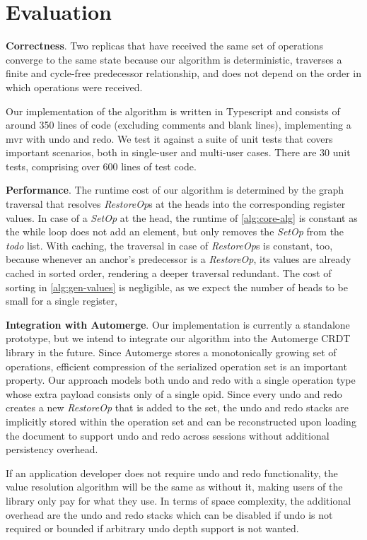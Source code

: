 \documentclass[sigplan]{acmart}
\newcommand{\setopkind}{\textit{SetOp}}
\newcommand{\restopkind}{\textit{RestoreOp}}
\begin{document}
\section{Evaluation}\label{sec:evaluation}

\textbf{Correctness}.
Two replicas that have received the same set of
operations converge to the same state because our algorithm is deterministic,
traverses a finite and cycle-free predecessor relationship,
and does not depend on the order in which operations were received.

Our implementation of the algorithm is written in Typescript and
consists of around 350 lines of code (excluding comments and blank lines),
implementing a \gls*{mvr} with undo and redo.
We test it against a suite of unit tests that covers important
scenarios, both in single-user and multi-user cases.
There are 30 unit tests, comprising over 600 lines of test code.

\textbf{Performance}.
The runtime cost of our algorithm is determined by the graph traversal that
resolves \restopkind{}s at the heads into the corresponding register values.
In case of a \setopkind{} at the head, the runtime of \cref{alg:core-alg}
is constant as the while loop does not add an element, but only
removes the \setopkind{} from the \textit{todo} list.
With caching, the traversal in case of \restopkind{}s is constant, too,
because whenever an anchor's predecessor is a \restopkind{},
its values are already cached in sorted order,
rendering a deeper traversal redundant.
The cost of sorting in \cref{alg:gen-values} is negligible,
as we expect the number of heads to be small for a single register,

\textbf{Integration with Automerge}.
Our implementation is currently a standalone prototype, but we intend to
integrate our algorithm into the Automerge CRDT library in the future.
Since Automerge stores a monotonically growing set of operations,
efficient compression of the serialized operation set is an important property.
Our approach models both undo and redo with a single
operation type whose extra payload consists only of a single \gls*{opid}.
Since every undo and redo creates a new \restopkind{} that is added
to the set,
the undo and redo stacks are implicitly stored within the operation set and
can be reconstructed upon loading the document to support undo and redo
across sessions without additional persistency overhead.

If an application developer does not require undo and redo functionality,
the value resolution algorithm will be the same as without it,
making users of the library only pay for what they use.
In terms of space complexity, the additional overhead are
the undo and redo stacks which can be disabled if undo is not required or
bounded if arbitrary undo depth support is not wanted.
\end{document}
